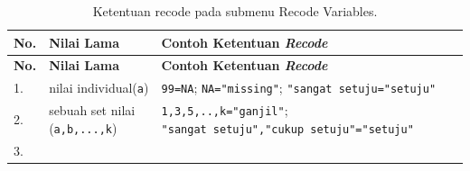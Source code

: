 \documentclass[12pt,]{krantz}
\begin{document}
\begin{longtable}[]{@{}lll@{}}
\caption{\label{tab:recodevar} Ketentuan recode pada submenu Recode Variables.}\tabularnewline
\toprule
\begin{minipage}[b]{0.06\columnwidth}\raggedright
\textbf{No.}\strut
\end{minipage} & \begin{minipage}[b]{0.23\columnwidth}\raggedright
\textbf{Nilai Lama}\strut
\end{minipage} & \begin{minipage}[b]{0.62\columnwidth}\raggedright
\textbf{Contoh Ketentuan \emph{Recode}}\strut
\end{minipage}\tabularnewline
\midrule
\endfirsthead
\toprule
\begin{minipage}[b]{0.06\columnwidth}\raggedright
\textbf{No.}\strut
\end{minipage} & \begin{minipage}[b]{0.23\columnwidth}\raggedright
\textbf{Nilai Lama}\strut
\end{minipage} & \begin{minipage}[b]{0.62\columnwidth}\raggedright
\textbf{Contoh Ketentuan \emph{Recode}}\strut
\end{minipage}\tabularnewline
\midrule
\endhead
\begin{minipage}[t]{0.06\columnwidth}\raggedright
1.\strut
\end{minipage} & \begin{minipage}[t]{0.23\columnwidth}\raggedright
nilai individual(\texttt{a})\strut
\end{minipage} & \begin{minipage}[t]{0.62\columnwidth}\raggedright
\texttt{99=NA}; \texttt{NA="missing"}; \texttt{"sangat\ setuju="setuju"}\strut
\end{minipage}\tabularnewline
\begin{minipage}[t]{0.06\columnwidth}\raggedright
2.\strut
\end{minipage} & \begin{minipage}[t]{0.23\columnwidth}\raggedright
sebuah set nilai (\texttt{a,b,...,k})\strut
\end{minipage} & \begin{minipage}[t]{0.62\columnwidth}\raggedright
\texttt{1,3,5,..,k="ganjil"}; \texttt{"sangat\ setuju","cukup\ setuju"="setuju"}\strut
\end{minipage}\tabularnewline
\begin{minipage}[t]{0.06\columnwidth}\raggedright
3.\strut
\end{minipage} & \begin{minipage}[t]{0.23\columnwidth}\raggedright

\end{minipage}
\end{longtable}
\end{document}
